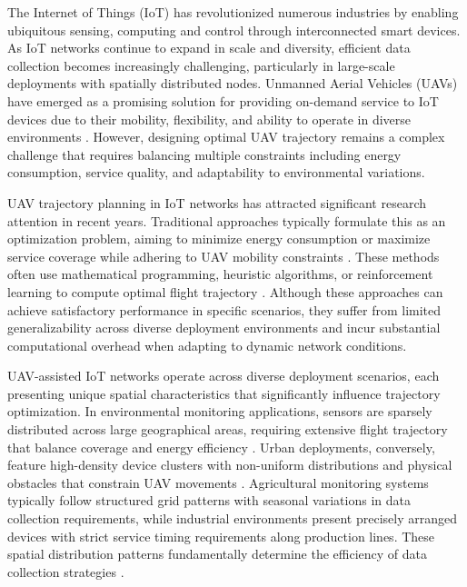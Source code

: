 \documentclass[10pt,conference,letterpaper]{IEEEtran}
\begin{document}
The Internet of Things (IoT) has revolutionized numerous industries by enabling ubiquitous sensing, computing and control through interconnected smart devices. As IoT networks continue to expand in scale and diversity, efficient data collection becomes increasingly challenging, particularly in large-scale deployments with spatially distributed nodes. Unmanned Aerial Vehicles (UAVs) have emerged as a promising solution for providing on-demand service to IoT devices due to their mobility, flexibility, and ability to operate in diverse environments \cite{DBLP:journals/jsac/ZhaoLHHPNQ25,journals/tsc/RoyTY25,DBLP:journals/tmc/GaoZ24}. However, designing optimal UAV trajectory remains a complex challenge that requires balancing multiple constraints including energy consumption, service quality, and adaptability to environmental variations.




UAV trajectory planning in IoT networks has attracted significant research attention in recent years. Traditional approaches typically formulate this as an optimization problem, aiming to minimize energy consumption or maximize service coverage while adhering to UAV mobility constraints \cite{DBLP:journals/tcom/ZhuZLLY24, DBLP:journals/comcom/FathollahiFA24}. These methods often use mathematical programming, heuristic algorithms, or reinforcement learning to compute optimal flight trajectory \cite{DBLP:journals/tiv/AdilSMAFJ24}. Although these approaches can achieve satisfactory performance in specific scenarios, they suffer from limited generalizability across diverse deployment environments and incur substantial computational overhead when adapting to dynamic network conditions.


UAV-assisted IoT networks operate across diverse deployment scenarios, each presenting unique spatial characteristics that significantly influence trajectory optimization. In environmental monitoring applications, sensors are sparsely distributed across large geographical areas, requiring extensive flight trajectory that balance coverage and energy efficiency \cite{DBLP:journals/iotj/LiuZ22a}. Urban deployments, conversely, feature high-density device clusters with non-uniform distributions and physical obstacles that constrain UAV movements \cite{DBLP:journals/tip/DaiZFQZY24}. Agricultural monitoring systems typically follow structured grid patterns with seasonal variations in data collection requirements, while industrial environments present precisely arranged devices with strict service timing requirements along production lines. These spatial distribution patterns fundamentally determine the efficiency of data collection strategies \cite{DBLP:journals/eswa/LiuLYZWS23,DBLP:journals/iotj/LiWSZCJ24}. 
\end{document}
